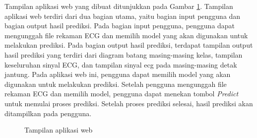 Tampilan aplikasi web yang dibuat ditunjukkan pada Gambar \ref{fig:aplikasi-web}.
Tampilan aplikasi web terdiri dari dua bagian utama, yaitu bagian input pengguna dan bagian output hasil prediksi.
Pada bagian input pengguna, pengguna dapat mengunggah file rekaman ECG dan memilih model yang akan digunakan untuk melakukan prediksi.
Pada bagian output hasil prediksi, terdapat tampilan output hasil prediksi yang terdiri dari diagram batang masing-masing kelas, tampilan keseluruhan sinyal ECG, dan tampilan sinyal ecg pada masing-masing detak jantung.
Pada aplikasi web ini, pengguna dapat memilih model yang akan digunakan untuk melakukan prediksi.
Setelah pengguna mengunggah file rekaman ECG dan memilih model, pengguna dapat menekan tombol \textit{Predict} untuk memulai proses prediksi.
Setelah proses prediksi selesai, hasil prediksi akan ditampilkan pada pengguna.

\begin{figure}[H]
  \centering
  \caption{Tampilan aplikasi web}
  \label{fig:aplikasi-web}
\end{figure}

